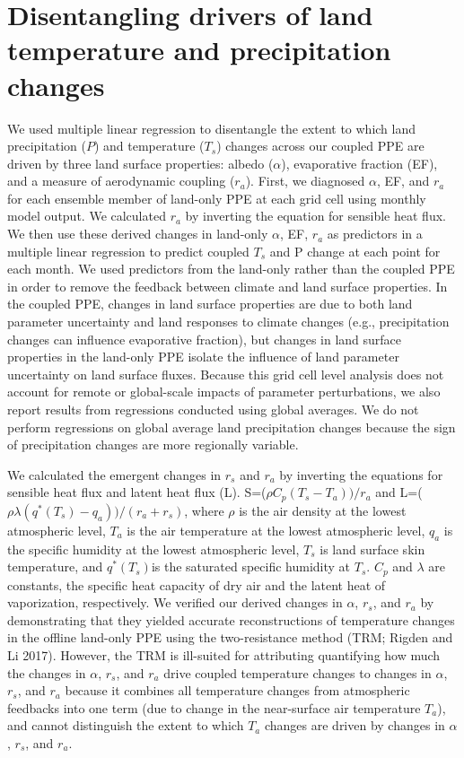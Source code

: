 \documentclass[draft, grl]{agujournal2019}
\begin{document}
\section{Disentangling drivers of land temperature and precipitation changes}
\label{Text:land_surface properties}

We used multiple linear regression to disentangle the extent to which land precipitation ($P$) and temperature ($T_s$) changes across our coupled PPE are driven by three land surface properties: albedo ($\alpha$), evaporative fraction (EF), and a measure of aerodynamic coupling ($r_a$). First, we diagnosed $\alpha$, EF, and $r_a$ for each ensemble member of land-only PPE at each grid cell using monthly model output. We calculated $r_a$ by inverting the equation for sensible heat flux. We then use these derived changes in land-only $\alpha$, EF, $r_a$ as predictors in a multiple linear regression to predict coupled $T_s$ and P change at each point for each month. We used predictors from the land-only rather than the coupled PPE in order to remove the feedback between climate and land surface properties. In the coupled PPE, changes in land surface properties are due to both land parameter uncertainty and land responses to climate changes (e.g., precipitation changes can influence evaporative fraction), but changes in land surface properties in the land-only PPE isolate the influence of land parameter uncertainty on land surface fluxes. Because this grid cell level analysis does not account for remote or global-scale impacts of parameter perturbations, we also report results from regressions conducted using global averages. We do not perform regressions on global average land precipitation changes because the sign of precipitation changes are more regionally variable. 

We calculated the emergent changes in $r_s$ and $r_a$ by inverting the equations for sensible heat flux and latent heat flux (L).  S=($\rho C_p (T_s-T_a))/r_a$  and L=($\rho \lambda(q^* (T_s)-q_a))/(r_a+r_s )$, where $\rho$ is the air density at the lowest atmospheric level, $T_a$ is the air temperature at the lowest atmospheric level, $q_a$ is the specific humidity at the lowest atmospheric level, $T_s$ is land surface skin temperature, and $q^* (T_s)$is the saturated specific humidity at $T_s$. $C_p$ and $\lambda$ are constants, the specific heat capacity of dry air and the latent heat of vaporization, respectively. We verified our derived changes in $\alpha$, $r_s$, and $r_a$ by demonstrating that they yielded accurate reconstructions of temperature changes in the offline land-only PPE using the two-resistance method (TRM; Rigden and Li 2017). However, the TRM is ill-suited for attributing quantifying how much the changes in $\alpha$, $r_s$, and $r_a$ drive coupled temperature changes to changes in $\alpha$, $r_s$, and $r_a$ because it combines all temperature changes from atmospheric feedbacks into one term (due to change in the near-surface  air temperature $T_a$), and cannot distinguish the extent to which $T_a$ changes are driven by changes in $\alpha$, $r_s$, and $r_a$.
\pagebreak
\end{document}

